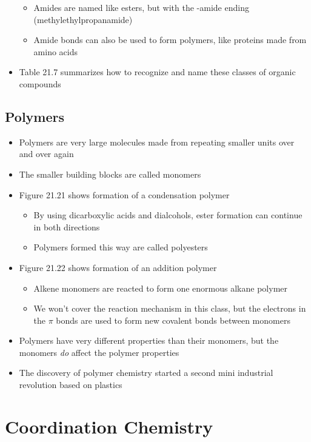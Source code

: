 \documentclass[12pt, openany, letterpaper]{memoir}
\begin{document}
\begin{itemize}
\begin{itemize}
		\item Amides are named like esters, but with the -amide ending (methylethylpropanamide)
		\item Amide bonds can also be used to form polymers, like proteins made from amino acids
	\end{itemize}
	\item Table 21.7 summarizes how to recognize and name these classes of organic compounds
\end{itemize}
\section{Polymers}
\begin{itemize}
	\item Polymers are very large molecules made from repeating smaller units over and over again
	\item The smaller building blocks are called monomers
	\item Figure 21.21 shows formation of a condensation polymer
	\begin{itemize}
		\item By using dicarboxylic acids and dialcohols, ester formation can continue in both directions
		\item Polymers formed this way are called polyesters
	\end{itemize}
	\item Figure 21.22 shows formation of an addition polymer
	\begin{itemize}
		\item Alkene monomers are reacted to form one enormous alkane polymer
		\item We won't cover the reaction mechanism in this class, but the electrons in the $\pi$ bonds are used to form new covalent bonds between monomers
	\end{itemize}
	\item Polymers have very different properties than their monomers, but the monomers \emph{do} affect the polymer properties
	\item The discovery of polymer chemistry started a second mini industrial revolution based on plastics
\end{itemize}

\chapter{Coordination Chemistry}
\end{document}
